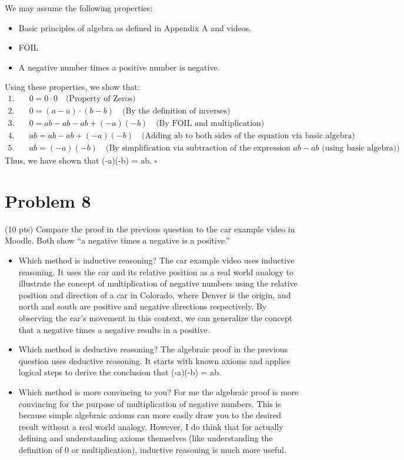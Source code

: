 \documentclass{article}
\begin{document}
We may assume the following properties:
\begin{itemize}
    \item Basic principles of algebra as defined in Appendix A and videos.
    \item FOIL
    \item A negative number times a positive number is negative.
\end{itemize}

Using these properties, we show that:
\begin{align*}
1. & \quad 0 = 0 \cdot 0 \quad \text{(Property of Zeros)} \\
2. & \quad 0 = (a - a)\cdot (b - b) \quad \text{(By the definition of inverses)} \\
3. & \quad 0 = ab - ab - a b + (-a)(-b) \quad \text{(By FOIL and multiplication)} \\
4. & \quad ab = ab - ab + (-a)(-b) \quad \text{(Adding ab to both sides of the equation via basic algebra)} \\
5. & \quad ab = (-a)(-b) \quad \text{(By simplification via subtraction of the expression $ab - ab$ (using basic algebra))}
\end{align*}
Thus, we have shown that (-a)(-b) = ab.
\hfill $\square$
\clearpage

\section{Problem 8}

(10 pts) Compare the proof in the previous question to the car example video in Moodle.
Both show “a negative times a negative is a positive.”

\begin{itemize}
    \item Which method is inductive reasoning?
    \medbreak
    The car example video uses inductive reasoning. It uses the car and its relative position as a real world analogy to illustrate the concept of multiplication of negative numbers using the relative position and direction of a car in Colorado, where Denver is the origin, and north and south are positive and negative directions respectively. By observing the car's movement in this context, we can generalize the concept that a negative times a negative results in a positive.
    \item Which method is deductive reasoning?
    \medbreak
    The algebraic proof in the previous question uses deductive reasoning. It starts with known axioms and applies logical steps to derive the conclusion that (-a)(-b) = ab.
    \item Which method is more convincing to you?
    \medbreak
    For me the algebraic proof is more convincing for the purpose of multiplication of negative numbers. This is because simple algebraic axioms can more easily draw you to the desired result without a real world analogy. However, I do think that for actually defining and understanding axioms themselves (like understanding the definition of 0 or multiplication), inductive reasoning is much more useful.
\end{itemize}

\clearpage
\end{document}
